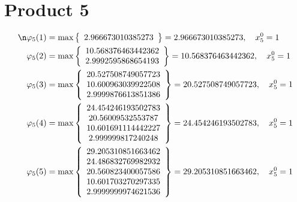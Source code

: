 \documentclass{article}
\begin{document}
\section{Product 5}
\begin{align*}
\n  
  
\varphi_{5}(1) &= \max \left\{ \begin{array}{c}
2.966673010385273
\end{array} \right\} = 2.966673010385273, \quad x_{5}^0 = 1\\
  
  
  
  
\varphi_{5}(2) &= \max \left\{ \begin{array}{c}
10.568376463442362 \\
 2.9992595868654193
\end{array} \right\} = 10.568376463442362, \quad x_{5}^0 = 1\\
  
  
  
  
\varphi_{5}(3) &= \max \left\{ \begin{array}{c}
20.527508749057723 \\
 10.600963039922508 \\
 2.9999876613851386
\end{array} \right\} = 20.527508749057723, \quad x_{5}^0 = 1\\
  
  
  
  
\varphi_{5}(4) &= \max \left\{ \begin{array}{c}
24.454246193502783 \\
 20.56009532553787 \\
 10.601691114442227 \\
 2.999999817240248
\end{array} \right\} = 24.454246193502783, \quad x_{5}^0 = 1\\
  
  
  
  
\varphi_{5}(5) &= \max \left\{ \begin{array}{c}
29.205310851663462 \\
 24.486832769982932 \\
 20.560823400057586 \\
 10.601703270297335 \\
 2.9999999974621536
\end{array} \right\} = 29.205310851663462, \quad x_{5}^0 = 1\\
  
  
  

\end{align*}
\end{document}
